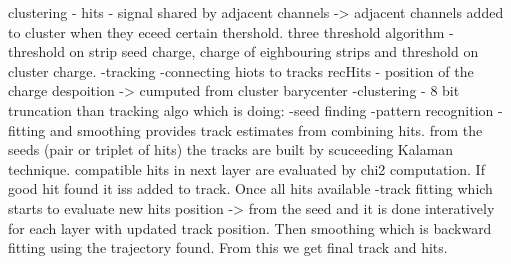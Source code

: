 clustering - hits - signal shared by adjacent channels -> adjacent channels added to cluster when they eceed certain thershold. three threshold algorithm - threshold on strip seed charge, charge of eighbouring strips and threshold on cluster charge.
-tracking -connecting hiots to tracks
recHits - position of the charge despoition -> cumputed from cluster barycenter
-clustering - 8 bit truncation
than tracking algo which is doing: %
-seed finding
-pattern recognition
-fitting and smoothing
provides track estimates from combining hits. from the seeds (pair or triplet of hits) the tracks are built by scuceeding Kalaman technique. compatible hits in next layer are evaluated by chi2 computation. If good hit found it iss added to track. Once all hits available -track fitting which starts to evaluate new hits position -> from the seed and it is done interatively for each layer with updated track position. Then smoothing which is backward fitting using the trajectory found. From this we get final track and hits.
